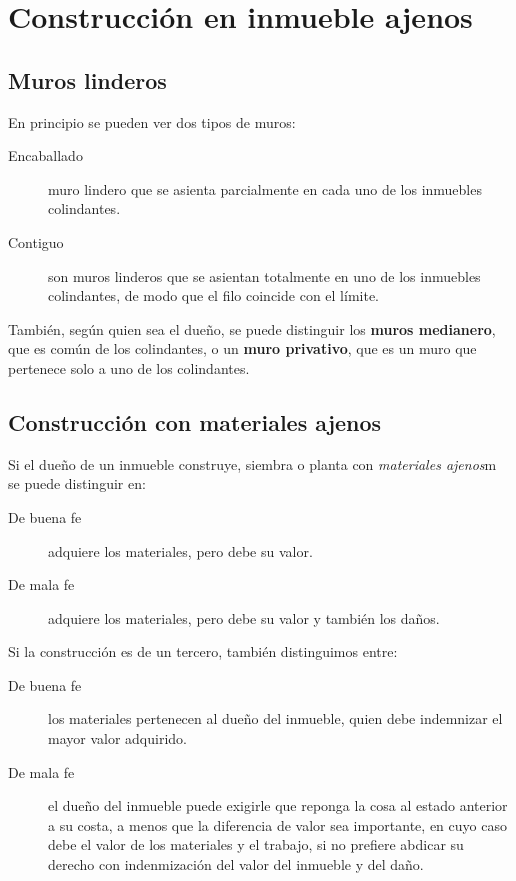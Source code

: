 \documentclass[../main.tex]{subfiles}
\begin{document}
\section{Construcción en inmueble ajenos}

\subsection{Muros linderos}

En principio se pueden ver dos tipos de muros:

\begin{description}
  \item[Encaballado] muro lindero que se asienta parcialmente en cada uno de los
    inmuebles colindantes.
  \item[Contiguo] son muros linderos que se asientan totalmente en uno de los
    inmuebles colindantes, de modo que el filo coincide con el límite.
\end{description}

También, según quien sea el dueño, se puede distinguir los \textbf{muros medianero},
que es común de los colindantes, o un \textbf{muro privativo}, que es un muro
que pertenece solo a uno de los colindantes.

\subsection{Construcción con materiales ajenos}

Si el dueño de un inmueble construye, siembra o planta con \textit{materiales ajenos}m
se puede distinguir en:

\begin{description}
  \item[De buena fe] adquiere los materiales, pero debe su valor.
  \item[De mala fe] adquiere los materiales, pero debe su valor y también los
    daños.
\end{description}

  Si la construcción es de un tercero, también distinguimos entre:

\begin{description}
  \item[De buena fe] los materiales pertenecen al dueño del inmueble, quien debe
    indemnizar el mayor valor adquirido.
  \item[De mala fe] el dueño del inmueble puede exigirle que reponga la cosa al
    estado anterior a su costa, a menos que la diferencia de valor sea importante,
    en cuyo caso debe el valor de los materiales y el trabajo, si no prefiere 
    abdicar su derecho con indenmización del valor del inmueble y del daño.
\end{description}
\end{document}
